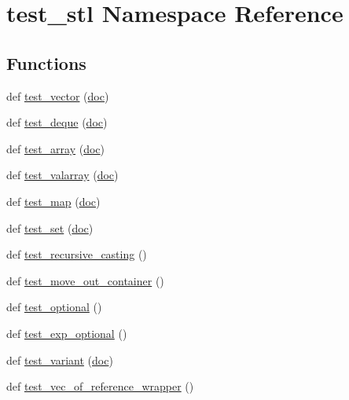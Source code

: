 \hypertarget{namespacetest__stl}{}\section{test\+\_\+stl Namespace Reference}
\label{namespacetest__stl}
\subsection*{Functions}
\begin{DoxyCompactItemize}
\item 
def \mbox{\hyperlink{namespacetest__stl_abd28f934b6c548550c11eabf5239e5fe}{test\+\_\+vector}} (\mbox{\hyperlink{structdoc}{doc}})
\item 
def \mbox{\hyperlink{namespacetest__stl_a1901fcf4767801c50d30f6b8c04d39f3}{test\+\_\+deque}} (\mbox{\hyperlink{structdoc}{doc}})
\item 
def \mbox{\hyperlink{namespacetest__stl_a4130bb835654765446af66d1279fd15f}{test\+\_\+array}} (\mbox{\hyperlink{structdoc}{doc}})
\item 
def \mbox{\hyperlink{namespacetest__stl_a967115fc8bb4608112859b1aac93ae53}{test\+\_\+valarray}} (\mbox{\hyperlink{structdoc}{doc}})
\item 
def \mbox{\hyperlink{namespacetest__stl_a47018e2dfd0e94c13b35e3fbe3ca3090}{test\+\_\+map}} (\mbox{\hyperlink{structdoc}{doc}})
\item 
def \mbox{\hyperlink{namespacetest__stl_abe691892c7f31972b423f19ddfe83b58}{test\+\_\+set}} (\mbox{\hyperlink{structdoc}{doc}})
\item 
def \mbox{\hyperlink{namespacetest__stl_ae4301c7bbd65df6783d4d0aa685b352d}{test\+\_\+recursive\+\_\+casting}} ()
\item 
def \mbox{\hyperlink{namespacetest__stl_a345c03c86a8555ffdf9a4a1f90b7d04c}{test\+\_\+move\+\_\+out\+\_\+container}} ()
\item 
def \mbox{\hyperlink{namespacetest__stl_a7293c8c08dec892fef3ff12e769cbc7f}{test\+\_\+optional}} ()
\item 
def \mbox{\hyperlink{namespacetest__stl_a3f57738501f53b459692c0ca3324e088}{test\+\_\+exp\+\_\+optional}} ()
\item 
def \mbox{\hyperlink{namespacetest__stl_a7e1741108c50e2513d8f444427767ba8}{test\+\_\+variant}} (\mbox{\hyperlink{structdoc}{doc}})
\item 
def \mbox{\hyperlink{namespacetest__stl_a579b9179d401bdb04bd7b8d3501b75c6}{test\+\_\+vec\+\_\+of\+\_\+reference\+\_\+wrapper}} ()
\item 

\end{DoxyCompactItemize}
